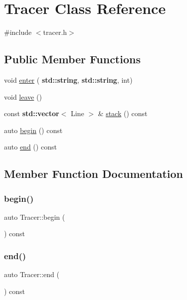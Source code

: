 \hypertarget{class_tracer}{}\section{Tracer Class Reference}
\label{class_tracer}


{\ttfamily \#include $<$tracer.\+h$>$}

\subsection*{Public Member Functions}
\begin{DoxyCompactItemize}
\item 
void \hyperlink{class_tracer_a600965ed14e9129378692f34ab567980}{enter} (\textbf{ std\+::string}, \textbf{ std\+::string}, int)
\item 
void \hyperlink{class_tracer_a436f4f1c904d748c93be33966f8a40ed}{leave} ()
\item 
const \textbf{ std\+::vector}$<$ Line $>$ \& \hyperlink{class_tracer_afaaf6df2d767ee945262c0a660cd77a9}{stack} () const
\item 
auto \hyperlink{class_tracer_a89678112c582773c6d5e27263b3dc9d1}{begin} () const
\item 
auto \hyperlink{class_tracer_ac80df028c375b7894d9d3edf5d4505bd}{end} () const
\end{DoxyCompactItemize}


\subsection{Member Function Documentation}
\mbox{\label{class_tracer_a89678112c582773c6d5e27263b3dc9d1}} 
\subsubsection{\texorpdfstring{begin()}{begin()}}
{\footnotesize\ttfamily auto Tracer\+::begin (\begin{DoxyParamCaption}{ }\end{DoxyParamCaption}) const\hspace{0.3cm}{\ttfamily [inline]}}

\mbox{\label{class_tracer_ac80df028c375b7894d9d3edf5d4505bd}} 
\subsubsection{\texorpdfstring{end()}{end()}}
{\footnotesize\ttfamily auto Tracer\+::end (\begin{DoxyParamCaption}{ }\end{DoxyParamCaption}) const\hspace{0.3cm}{\ttfamily [inline]}}

